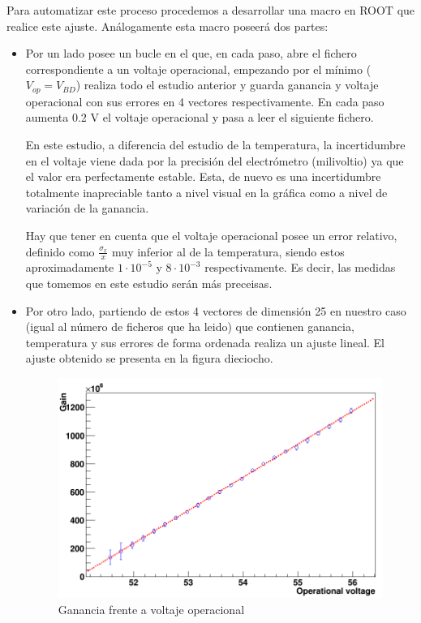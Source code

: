 Para automatizar este proceso procedemos a desarrollar una macro en ROOT que realice este ajuste. Análogamente esta macro poseerá dos partes:
\begin{itemize}
\item{} Por un lado posee un bucle en el que, en cada paso, abre el fichero correspondiente a un voltaje operacional, empezando por el mínimo ($V_{op}=V_{BD}$) realiza todo el estudio anterior y guarda ganancia y voltaje operacional con sus errores en 4 vectores respectivamente. En cada paso aumenta 0.2 V el voltaje operacional y pasa a leer el siguiente fichero. 

En este estudio, a diferencia del estudio de la temperatura, la incertidumbre en el voltaje viene dada por la precisión del electrómetro (milivoltio) ya que el valor era perfectamente estable. Esta, de nuevo es una incertidumbre totalmente inapreciable tanto a nivel visual en la gráfica como a nivel de variación de la ganancia. 

Hay que tener en cuenta que el voltaje operacional posee un error relativo, definido como $\frac{\sigma_x}{x}$ muy inferior al de la temperatura, siendo estos aproximadamente $1 \cdot 10^{-5}$ y $8 \cdot 10^{-3}$ respectivamente. Es decir, las medidas que tomemos en este estudio serán más preceisas.

\item {} Por otro lado, partiendo de estos 4 vectores de dimensión 25 en nuestro caso (igual al número de ficheros que ha leido) que contienen ganancia, temperatura y sus errores de forma ordenada realiza un ajuste lineal. El ajuste obtenido se presenta en la figura dieciocho.

\begin{figure}[hbtp]
\centering
\includegraphics[scale=0.4]{Dependenciavoltaje.png}
\caption{ Ganancia frente a voltaje operacional}
\end{figure}


\end{itemize}
